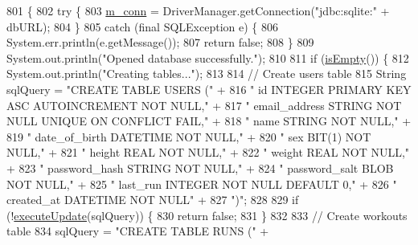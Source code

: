 \begin{DoxyCode}
801                                      \{
802         \textcolor{keywordflow}{try} \{
803             \mbox{\hyperlink{classcom_1_1activitytracker_1_1_d_b_manager_a064088d13ac09eb147fdc19268771521}{m\_conn}} = DriverManager.getConnection(\textcolor{stringliteral}{"jdbc:sqlite:"} + dbURL);
804         \}
805         \textcolor{keywordflow}{catch} (\textcolor{keyword}{final} SQLException e) \{
806             System.err.println(e.getMessage());
807             \textcolor{keywordflow}{return} \textcolor{keyword}{false};
808         \}
809         System.out.println(\textcolor{stringliteral}{"Opened database successfully."});
810 
811         \textcolor{keywordflow}{if} (\mbox{\hyperlink{classcom_1_1activitytracker_1_1_d_b_manager_af9ab112f840e3c803b6b28a2f1a15215}{isEmpty}}()) \{
812             System.out.println(\textcolor{stringliteral}{"Creating tables..."});
813 
814             \textcolor{comment}{// Create users table}
815             String sqlQuery = \textcolor{stringliteral}{"CREATE TABLE USERS ("} +
816                     \textcolor{stringliteral}{"    id            INTEGER PRIMARY KEY ASC AUTOINCREMENT NOT NULL,"} +
817                     \textcolor{stringliteral}{"    email\_address STRING  NOT NULL UNIQUE ON CONFLICT FAIL,"} +
818                     \textcolor{stringliteral}{"    name          STRING  NOT NULL,"} +
819                     \textcolor{stringliteral}{"    date\_of\_birth DATETIME    NOT NULL,"} +
820                     \textcolor{stringliteral}{"    sex           BIT(1)  NOT NULL,"} +
821                     \textcolor{stringliteral}{"    height        REAL    NOT NULL,"} +
822                     \textcolor{stringliteral}{"    weight        REAL    NOT NULL,"} +
823                     \textcolor{stringliteral}{"    password\_hash STRING  NOT NULL,"} +
824                     \textcolor{stringliteral}{"    password\_salt BLOB    NOT NULL,"} +
825                     \textcolor{stringliteral}{"    last\_run      INTEGER NOT NULL DEFAULT 0,"} +
826                     \textcolor{stringliteral}{"    created\_at    DATETIME    NOT NULL"} +
827                     \textcolor{stringliteral}{")"};
828 
829             \textcolor{keywordflow}{if} (!\mbox{\hyperlink{classcom_1_1activitytracker_1_1_d_b_manager_a382397e2bdf309901d1c80ff66be69b7}{executeUpdate}}(sqlQuery)) \{
830                 \textcolor{keywordflow}{return} \textcolor{keyword}{false};
831             \}
832 
833             \textcolor{comment}{// Create workouts table}
834             sqlQuery = \textcolor{stringliteral}{"CREATE TABLE RUNS ("} +

\end{DoxyCode}
